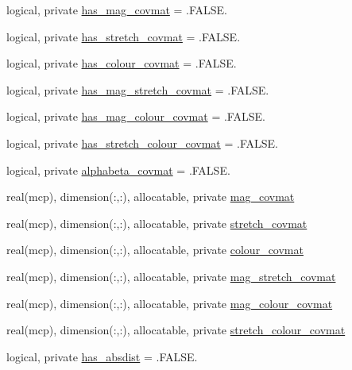 \begin{DoxyCompactItemize}
\item 
logical, private \mbox{\hyperlink{namespacesnls_aa8d535884df485fb5762eb12ad31da9a}{has\+\_\+mag\+\_\+covmat}} = .F\+A\+L\+S\+E.
\item 
logical, private \mbox{\hyperlink{namespacesnls_ae63c79b57efec7300a23d6437079ddae}{has\+\_\+stretch\+\_\+covmat}} = .F\+A\+L\+S\+E.
\item 
logical, private \mbox{\hyperlink{namespacesnls_aa953f2792677b7c901fc89bebdd40c36}{has\+\_\+colour\+\_\+covmat}} = .F\+A\+L\+S\+E.
\item 
logical, private \mbox{\hyperlink{namespacesnls_ae787ac7d0741e06d7699e05e691c1fac}{has\+\_\+mag\+\_\+stretch\+\_\+covmat}} = .F\+A\+L\+S\+E.
\item 
logical, private \mbox{\hyperlink{namespacesnls_a3557a6ed568984b4640e4128088cbf19}{has\+\_\+mag\+\_\+colour\+\_\+covmat}} = .F\+A\+L\+S\+E.
\item 
logical, private \mbox{\hyperlink{namespacesnls_a72767d5a50117b705a1dcb971e24462d}{has\+\_\+stretch\+\_\+colour\+\_\+covmat}} = .F\+A\+L\+S\+E.
\item 
logical, private \mbox{\hyperlink{namespacesnls_ab8a52f43b875f3858fb98da0194a2cb8}{alphabeta\+\_\+covmat}} = .F\+A\+L\+S\+E.
\item 
real(mcp), dimension(\+:,\+:), allocatable, private \mbox{\hyperlink{namespacesnls_a0dc9a08e398ee49bd864a8d88d95f195}{mag\+\_\+covmat}}
\item 
real(mcp), dimension(\+:,\+:), allocatable, private \mbox{\hyperlink{namespacesnls_a56f3f501856e1777e0bb4960509f5d85}{stretch\+\_\+covmat}}
\item 
real(mcp), dimension(\+:,\+:), allocatable, private \mbox{\hyperlink{namespacesnls_afed063275d19022044504128d8238e76}{colour\+\_\+covmat}}
\item 
real(mcp), dimension(\+:,\+:), allocatable, private \mbox{\hyperlink{namespacesnls_a5ed1dbc069e004d9de1dd21d5c7786bc}{mag\+\_\+stretch\+\_\+covmat}}
\item 
real(mcp), dimension(\+:,\+:), allocatable, private \mbox{\hyperlink{namespacesnls_a0579d76af88ce5be98b90af1b8d09b20}{mag\+\_\+colour\+\_\+covmat}}
\item 
real(mcp), dimension(\+:,\+:), allocatable, private \mbox{\hyperlink{namespacesnls_ad9f9a58ffeb62ad8e3c79c1c06f4fc1f}{stretch\+\_\+colour\+\_\+covmat}}
\item 
logical, private \mbox{\hyperlink{namespacesnls_ac58c726d5874a3387309a8b805bfecee}{has\+\_\+absdist}} = .F\+A\+L\+S\+E.
\item 

\end{DoxyCompactItemize}
